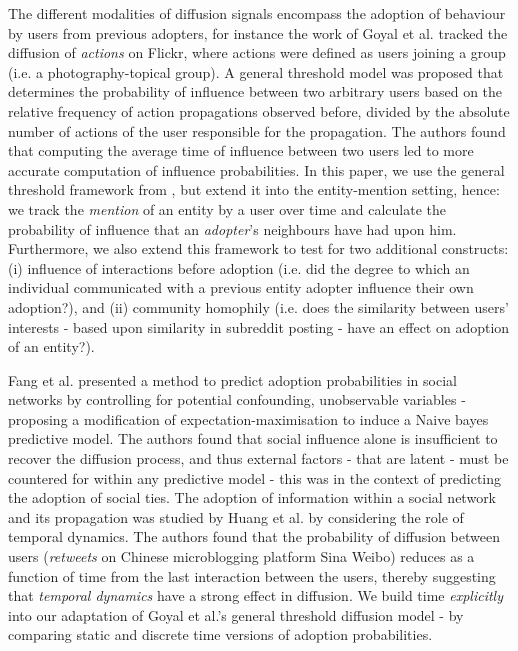 \documentclass[10pt,journal,compsoc]{IEEEtran}
\begin{document}
The different modalities of diffusion signals encompass the adoption of behaviour by users from previous adopters, for instance the work of Goyal et al. \cite{goyal2010learning} tracked the diffusion of \emph{actions} on Flickr, where actions were defined as users joining a group (i.e. a photography-topical group).
A general threshold model was proposed that determines the probability of influence between two arbitrary users based on the relative frequency of action propagations observed before, divided by the absolute number of actions of the user responsible for the propagation.
The authors found that computing the average time of influence between two users led to more accurate computation of influence probabilities.
In this paper, we use the general threshold framework from \cite{goyal2010learning}, but extend it into the entity-mention setting, hence: we track the \emph{mention} of an entity by a user over time and calculate the probability of influence that an \emph{adopter}'s neighbours have had upon him.
Furthermore, we also extend this framework to test for two additional constructs: (i) influence of interactions before adoption (i.e. did the degree to which an individual communicated with a previous entity adopter influence their own adoption?), and (ii) community homophily (i.e. does the similarity between users' interests - based upon similarity in subreddit posting - have an effect on adoption of an entity?).

Fang et al. \cite{fang2013predicting} presented a method to predict adoption probabilities in social networks by controlling for potential confounding, unobservable variables - proposing a modification of expectation-maximisation to induce a Naive bayes predictive model.
The authors found that social influence alone is insufficient to recover the diffusion process, and thus external factors - that are latent - must be countered for within any predictive model - this was in the context of predicting the adoption of social ties.
The adoption of information within a social network and its propagation was studied by Huang et al. \cite{huang2014temporal} by considering the role of temporal dynamics.
The authors found that the probability of diffusion between users (\emph{retweets} on Chinese microblogging platform Sina Weibo) reduces as a function of time from the last interaction between the users, thereby suggesting that \emph{temporal dynamics} have a strong effect in diffusion.
We build time \emph{explicitly} into our adaptation of Goyal et al.'s \cite{goyal2010learning} general threshold diffusion model - by comparing static and discrete time versions of adoption probabilities.
\end{document}
